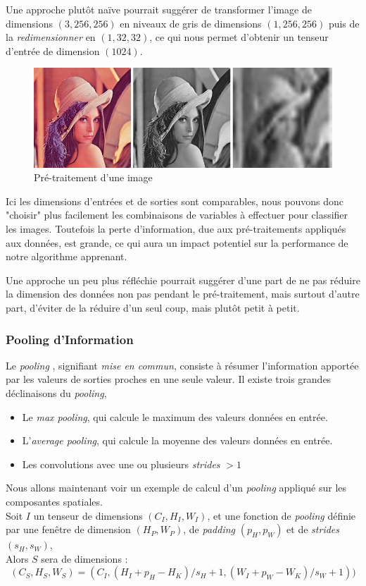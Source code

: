 \documentclass[a4paper, 11pt]{report}
\begin{document}
Une approche plutôt naïve pourrait suggérer de transformer l'image de dimensions $(3, 256, 256)$ en niveaux de gris de dimensions $(1, 256, 256)$ puis de la \emph{redimensionner} en $(1, 32, 32)$, ce qui nous permet d'obtenir un tenseur d'entrée de dimension $(1024)$.
\begin{figure}[H]
	\centering
	\includegraphics[scale=0.4]{Images/Lena.jpg}
	\caption{Pré-traitement d'une image}
\end{figure}
Ici les dimensions d'entrées et de sorties sont comparables, nous pouvons donc "choisir" plus facilement les combinaisons de variables à effectuer pour classifier les images. Toutefois la perte d'information, due aux pré-traitements appliqués aux données, est grande, ce qui aura un impact potentiel sur la performance de notre algorithme apprenant.

Une approche un peu plus réfléchie pourrait suggérer d'une part de ne pas réduire la dimension des données non pas pendant le pré-traitement, mais surtout d'autre part, d'éviter de la réduire d'un seul coup, mais plutôt petit à petit.

\subsubsection{Pooling d'Information}
Le \emph{pooling} \citep{Krizhevsky2012}, signifiant \emph{mise en commun}, consiste à résumer l'information apportée par les valeurs de sorties proches en une seule valeur.
Il existe trois grandes déclinaisons du \emph{pooling},
\begin{itemize}
	\item Le \emph{max pooling}, qui calcule le maximum des valeurs données en entrée.
	\item L'\emph{average pooling}, qui calcule la moyenne des valeurs données en entrée.
	\item Les convolutions avec une ou plusieurs \emph{strides} $> 1$
\end{itemize}
Nous allons maintenant voir un exemple de calcul d'un \emph{pooling} appliqué sur les composantes spatiales.\\
Soit $I$ un tenseur de dimensions $(C_I, H_I, W_I)$, et une fonction de \emph{pooling} définie par une fenêtre de dimension $(H_P, W_P)$, de \emph{padding} $(p_H, p_W)$ et de \emph{strides} $(s_H, s_W)$,\\
Alors $S$ sera de dimensions :
$$(C_S, H_S, W_S) = (C_I, (H_I + p_H - H_K) / s_H + 1, (W_I + p_W - W_K) / s_W + 1))$$
\end{document}
